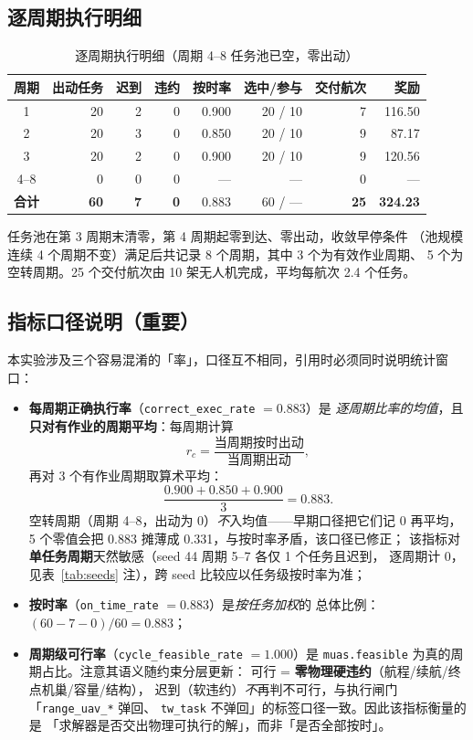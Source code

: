 \documentclass[a4paper,11pt]{article}
\begin{document}
\subsection{逐周期执行明细}

\begin{table}[H]
\centering
\caption{逐周期执行明细（周期 4--8 任务池已空，零出动）}
\label{tab:cycles}
\small
\begin{tabular}{crrrrrrr}
\toprule
周期 & 出动任务 & 迟到 & 违约 & 按时率 & 选中/参与 & 交付航次 & 奖励 \\
\midrule
1 & 20 & 2 & 0 & 0.900 & 20 / 10 & 7 & 116.50 \\
2 & 20 & 3 & 0 & 0.850 & 20 / 10 & 9 &  87.17 \\
3 & 20 & 2 & 0 & 0.900 & 20 / 10 & 9 & 120.56 \\
\midrule
4--8 & 0 & 0 & 0 & --- & --- & 0 & --- \\
\midrule
\textbf{合计} & \textbf{60} & \textbf{7} & \textbf{0} & 0.883 & 60 / --- & \textbf{25} & \textbf{324.23} \\
\bottomrule
\end{tabular}
\end{table}

任务池在第 3 周期末清零，第 4 周期起零到达、零出动，收敛早停条件
（池规模连续 4 个周期不变）满足后共记录 8 个周期，其中 3 个为有效作业周期、
5 个为空转周期。25 个交付航次由 10 架无人机完成，平均每航次 2.4 个任务。

\subsection{指标口径说明（重要）}
\label{sec:caliber}

本实验涉及三个容易混淆的「率」，口径互不相同，引用时必须同时说明统计窗口：

\begin{itemize}
  \item \textbf{每周期正确执行率}（\texttt{correct\_exec\_rate} $=0.883$）是
        \emph{逐周期比率的均值}，且\textbf{只对有作业的周期平均}：每周期计算
        \[
          r_c = \frac{\text{当周期按时出动}}{\text{当周期出动}},
        \]
        再对 3 个有作业周期取算术平均：
        \[
          \frac{0.900+0.850+0.900}{3}=0.883 .
        \]
        空转周期（周期 4--8，出动为 0）\emph{不}入均值——早期口径把它们记 0
        再平均，5 个零值会把 0.883 摊薄成 0.331，与按时率矛盾，该口径已修正；
        该指标对\textbf{单任务周期}天然敏感（seed 44 周期 5--7 各仅 1 个任务且迟到，
        逐周期计 0，见表~\ref{tab:seeds} 注），跨 seed 比较应以任务级按时率为准；
  \item \textbf{按时率}（\texttt{on\_time\_rate} $=0.883$）是\emph{按任务加权}的
        总体比例：$(60-7-0)/60=0.883$；
  \item \textbf{周期级可行率}（\texttt{cycle\_feasible\_rate} $=1.000$）是
        \texttt{muas.feasible} 为真的周期占比。注意其语义随约束分层更新：
        可行 = \textbf{零物理硬违约}（航程/续航/终点机巢/容量/结构），
        迟到（软违约）\emph{不}再判不可行，与执行闸门「\texttt{range\_uav\_*} 弹回、
        \texttt{tw\_task} 不弹回」的标签口径一致。因此该指标衡量的是
        「求解器是否交出物理可执行的解」，而非「是否全部按时」。
\end{itemize}
\end{document}
